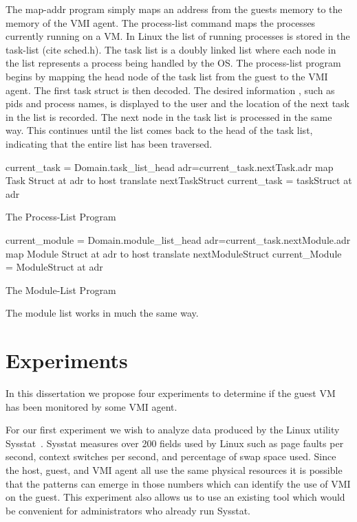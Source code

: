 The map-addr program simply maps an address from the guests memory to the memory of the VMI agent. The process-list command maps the processes currently running on a VM. In Linux the list of running processes is stored in the task-list (cite sched.h). The task list is a doubly linked list where each node in the list represents a process being handled by the OS. The process-list program begins by mapping the head node of the task list from the guest to the VMI agent. The first task struct is then decoded. The desired information , such as pids and process names, is displayed to the user and the location of the next task in the list is recorded. The next node in the task list is processed in the same way. This continues until the list comes back to the head of the task list, indicating that the entire list has been traversed. 


\begin{algorithm}[p]\label{ProcList}
	\SetAlgoLined
	current\_task = Domain.task\_list\_head\;
	{
	 	adr=current\_task.nextTask.adr \;
	 	map Task Struct at adr to host \;
	 	translate nextTaskStruct 	   \;
	 	current\_task = taskStruct at adr \;
	}
	\caption{The Process-List Program}
\end{algorithm}


\begin{algorithm}[p]\label{ModList}
	\SetAlgoLined
	current\_module = Domain.module\_list\_head\;
	{
	 	adr=current\_task.nextModule.adr \;
	 	map Module Struct at adr to host \;
	 	translate nextModuleStruct 	   \;
	 	current\_Module = ModuleStruct at adr \;
	}
	\caption{The Module-List Program}
\end{algorithm}



The module list works in much the same way. 


\section{Experiments}
In this dissertation we propose four experiments to determine if the guest VM has been monitored by some VMI agent.  

For our first experiment we wish to analyze data produced by the Linux utility Sysstat~\cite{godard_sysstat_2010}. Sysstat measures over 200 fields used by Linux such as page faults per second, context switches per second, and percentage of swap space used. Since the host, guest, and VMI agent all use the same physical resources it is possible that the patterns can emerge in those numbers which can identify the use of VMI on the guest. This experiment also allows us to use an existing tool which would be convenient for administrators who already run Sysstat.

